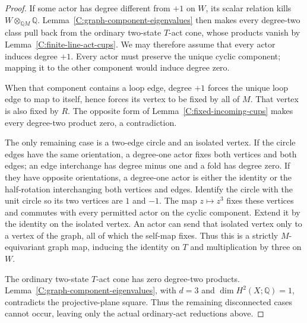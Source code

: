 \begin{proof}
If some actor has degree different from $+1$ on $W$, its scalar
relation kills $W\otimes_{\mathbb QM}\mathbb Q$.
Lemma~\ref{C:graph-component-eigenvalues} then makes every degree-two
class pull back from the ordinary two-state $T$-act cone, whose
products vanish by Lemma~\ref{C:finite-line-act-cups}.
We may therefore assume that every actor induces degree $+1$.
Every actor must preserve the unique cyclic component; mapping it
to the other component would induce degree zero.

When that component contains a loop edge, degree $+1$ forces
the unique loop edge to map to itself, hence forces its vertex
to be fixed by all of $M$. That vertex is also fixed by $R$.
The opposite form of Lemma~\ref{C:fixed-incoming-cups} makes
every degree-two product zero, a contradiction.

The only remaining case is a two-edge circle and an isolated
vertex. If the circle edges have the same orientation, a degree-one
actor fixes both vertices and both edges; an edge interchange has
degree minus one and a fold has degree zero. If they have opposite
orientations, a degree-one actor is either the identity or the
half-rotation interchanging both vertices and edges.
Identify the circle with the unit circle so its two vertices are
$1$ and $-1$. The map $z\mapsto z^3$ fixes these vertices and
commutes with every permitted actor on the cyclic component.
Extend it by the identity on the isolated vertex. An actor can
send that isolated vertex only to a vertex of the graph, all of
which the self-map fixes. Thus this is a strictly $M$-equivariant
graph map, inducing the identity on $T$ and multiplication by
three on $W$.

The ordinary two-state $T$-act cone has zero degree-two products.
Lemma~\ref{C:graph-component-eigenvalues}, with $d=3$ and
$\dim H^2(X;\mathbb Q)=1$, contradicts the projective-plane square.
Thus the remaining disconnected cases cannot occur, leaving only
the actual ordinary-act reductions above.
\end{proof}

